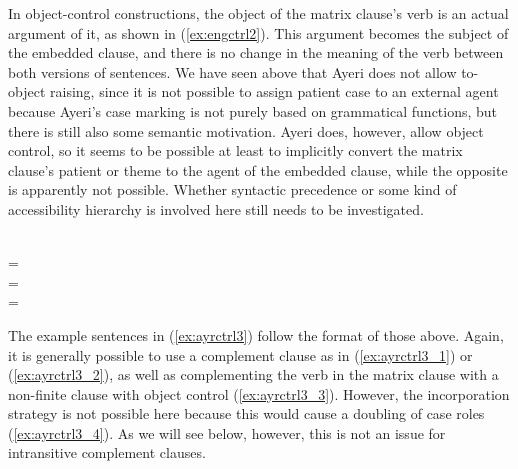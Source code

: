 In object-control constructions, the object of the matrix clause's verb is an
actual argument of it, as shown in (\ref{ex:engctrl2}). This argument becomes
the subject of the embedded clause, and there is no change in the meaning of
the verb between both versions of sentences. We have seen above that Ayeri does
not allow to-object raising, since it is not possible to assign patient case to
an external agent because Ayeri's case marking is not purely based on
grammatical functions, but there is still also some semantic motivation. Ayeri
does, however, allow object control, so it seems to be possible at least to
implicitly convert the matrix clause's patient or theme to the agent of the
embedded clause, while the opposite is apparently not possible. Whether
syntactic precedence or some kind of accessibility hierarchy is involved here
still needs to be investigated.

\pex\label{ex:engctrl2}
\a {}\\
	= 
\a {}\\
	= 
\a {}\\
	= 
\xe

The example sentences in (\ref{ex:ayrctrl3}) follow the format of those above.
Again, it is generally possible to use a complement clause as in
(\ref{ex:ayrctrl3_1}) or (\ref{ex:ayrctrl3_2}), as well as complementing the
verb in the matrix clause with a non-finite clause with object control
(\ref{ex:ayrctrl3_3}). However, the incorporation strategy is not possible here
because this would cause a doubling of case roles (\ref{ex:ayrctrl3_4}). As we
will see below, however, this is not an issue for intransitive complement
clauses.

